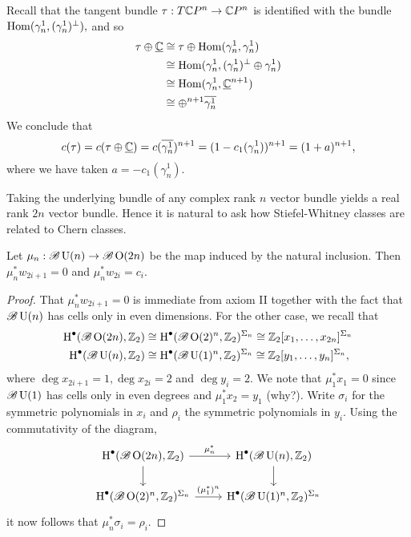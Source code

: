 \documentclass{amsart}
\begin{document}
\begin{example}
    Recall that the tangent bundle $\tau:T\mathbb{C} P^n\to\mathbb{C} P^n$ is identified with the bundle
    $\operatorname{Hom}(\gamma_n^1, (\gamma_n^1)^\perp),$ and so
    \begin{align*}
        \tau\oplus \underline{\mathbb{C}} &\cong \tau\oplus\operatorname{Hom}(\gamma_n^1,\gamma_n^1)\\
        &\cong \operatorname{Hom}(\gamma^1_n, (\gamma^1_n)^\perp\oplus \gamma_n^1)\\
        &\cong \operatorname{Hom}(\gamma^1_n, \underline{\mathbb{C}}^{n+1})\\
        &\cong \oplus^{n+1}\overline{\gamma_n^1}
    \end{align*}
    We conclude that
    \begin{equation*}
        c(\tau)=c(\tau\oplus\underline{\mathbb{C}})=c(\overline{\gamma_n^1})^{n+1}=(1-c_1(\gamma_n^1))^{n+1}=(1+a)^{n+1},
    \end{equation*}
    where we have taken $a=-c_1(\gamma_n^1)$.
\end{example}

Taking the underlying bundle of any complex rank $n$ vector bundle yields a real rank $2n$ vector bundle.
Hence it is natural to ask how Stiefel-Whitney classes are related to Chern classes.
\begin{proposition}
    Let $\mu_n:\mathscr{B}\operatorname{U}(n) \to \mathscr{B}\operatorname{O}(2n)$ be the map induced by the natural
    inclusion. Then $\mu_n^*w_{2i+1}=0$ and $\mu_n^*w_{2i}=c_i$.
\end{proposition}
\begin{proof}
    That $\mu^*_nw_{2i+1}=0$ is immediate from axiom II together with the fact that $\mathscr{B}\operatorname{U}(n)$
    has cells only in even dimensions. For the other case, we recall that
    \begin{align*}
        \operatorname{H}^\bullet(\mathscr{B}\operatorname{O}(2n),\mathbb{Z}_2) &\cong \operatorname{H}^\bullet(\mathscr{B}\operatorname{O}(2)^n,\mathbb{Z}_2)^{\Sigma_n}\cong\mathbb{Z}_2[x_1,\ldots,x_{2n}]^{\Sigma_n}\\
        \operatorname{H}^\bullet(\mathscr{B}\operatorname{U}(n),\mathbb{Z}_2) &\cong \operatorname{H}^\bullet(\mathscr{B}\operatorname{U}(1)^n,\mathbb{Z}_2)^{\Sigma_n}\cong\mathbb{Z}_2[y_1,\ldots,y_n]^{\Sigma_n},
    \end{align*}
    where $\deg x_{2i+1}=1, \deg x_{2i}=2$ and $\deg y_i=2$. We note that $\mu_1^*x_1=0$ since $\mathscr{B}\operatorname{U}(1)$
    has cells only in even degrees and $\mu_1^*x_2=y_1$ ({\color{magenta}why?}).
    Write $\sigma_i$ for the symmetric polynomials in $x_i$ and $\rho_i$ the symmetric polynomials in $y_i$.
    Using the commutativity of the diagram,
    \begin{equation*}
        \begin{tikzcd}
            \HH^\bullet(\mathscr{B}\OO(2n),\Z_2)\ar{r}{\mu_n^*}\ar{d} & \HH^\bullet(\mathscr{B}\UU(n),\Z_2)\ar{d}\\
            \HH^\bullet(\mathscr{B}\OO(2)^n,\Z_2)^{\Sigma_n}\ar{r}{(\mu_1^*)^n} & \HH^\bullet(\mathscr{B}\UU(1)^n,\Z_2)^{\Sigma_n}
        \end{tikzcd}
    \end{equation*}
    it now follows that $\mu_n^*\sigma_i=\rho_i$.
\end{proof}
\end{document}
